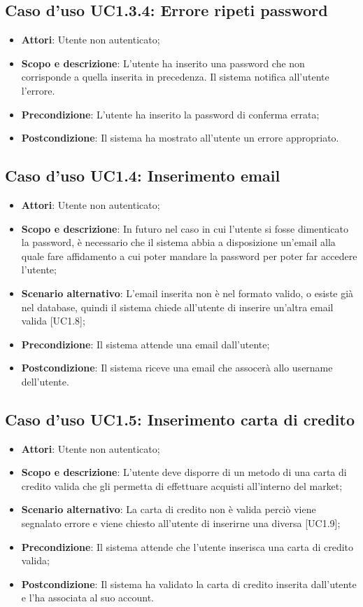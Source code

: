 \documentclass[12pt,a4paper,titlepage]{article}
\begin{document}
	\subsection{Caso d'uso UC1.3.4: Errore ripeti password}
	\label{UC1.3.4}
	\begin{itemize}
		\item \textbf{Attori}: Utente non autenticato;
		\item \textbf{Scopo e descrizione}: L'utente ha inserito una password che non corrisponde a quella inserita in precedenza. Il sistema notifica all'utente l'errore.
		\item \textbf{Precondizione}: L'utente ha inserito la password di conferma errata;
		\item \textbf{Postcondizione}: Il sistema ha mostrato all'utente un errore appropriato.
	\end{itemize}
	\subsection{Caso d'uso UC1.4: Inserimento email}
	\label{UC1.4}
	\begin{itemize}
		\item \textbf{Attori}: Utente non autenticato;
		\item \textbf{Scopo e descrizione}: In futuro nel caso in cui l'utente si fosse dimenticato la password, è necessario che il sistema abbia a disposizione un'email alla quale fare affidamento a cui poter mandare la password per poter far accedere l'utente;
		\item \textbf{Scenario alternativo}: L'email inserita non è nel formato valido, o esiste già nel database, quindi il sistema chiede all'utente di inserire un'altra email valida [UC1.8];
		\item \textbf{Precondizione}: Il sistema attende una email dall'utente;
		\item \textbf{Postcondizione}: Il sistema riceve una email che assocerà allo username dell'utente.
	\end{itemize}
	\subsection{Caso d'uso UC1.5: Inserimento carta di credito}
	\label{UC1.5}
	\begin{itemize}
		\item \textbf{Attori}: Utente non autenticato;
		\item \textbf{Scopo e descrizione}: L'utente deve disporre di un metodo di una carta di credito valida che gli permetta di effettuare acquisti all'interno del market;
		\item \textbf{Scenario alternativo}: La carta di credito non è valida perciò viene segnalato errore e viene chiesto all'utente di inserirne una diversa [UC1.9];
		\item \textbf{Precondizione}: Il sistema attende che l'utente inserisca una carta di credito valida;
		\item \textbf{Postcondizione}: Il sistema ha validato la carta di credito inserita dall'utente e l'ha associata al suo account.
	\end{itemize}
\end{document}
